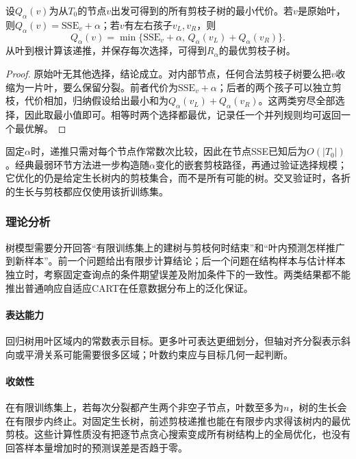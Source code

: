 \begin{theorem}[固定生长树内的最优剪枝]
  \label{thm:regression-pruning}
  设$Q_\alpha(v)$为从$T_0$的节点$v$出发可得到的所有剪枝子树的最小代价。若$v$是原始叶，则$Q_\alpha(v)=\mathrm{SSE}_v+\alpha$；若$v$有左右孩子$v_L,v_R$，则
  \[
    Q_\alpha(v)=\min\{\mathrm{SSE}_v+\alpha,\,
                     Q_\alpha(v_L)+Q_\alpha(v_R)\}.
  \]
  从叶到根计算该递推，并保存每次选择，可得到$R_\alpha$的最优剪枝子树。
\end{theorem}

\begin{proof}
原始叶无其他选择，结论成立。对内部节点，任何合法剪枝子树要么把$v$收缩为一片叶，要么保留分裂。前者代价为$\mathrm{SSE}_v+\alpha$；后者的两个孩子可以独立剪枝，代价相加，归纳假设给出最小和为$Q_\alpha(v_L)+Q_\alpha(v_R)$。这两类穷尽全部选择，因此取最小值即可。相等时两个选择都最优，记录任一个并列规则均可返回一个最优解。
\end{proof}

固定$\alpha$时，递推只需对每个节点作常数次比较，因此在节点SSE已知后为$O(|T_0|)$。经典最弱环节方法进一步构造随$\alpha$变化的嵌套剪枝路径，再通过验证选择规模；它优化的仍是给定生长树内的剪枝集合，而不是所有可能的树。交叉验证时，各折的生长与剪枝都应仅使用该折训练集。

\subsubsection{理论分析}
\label{sec:regression-cart-theory}

树模型需要分开回答“有限训练集上的建树与剪枝何时结束”和“叶内预测怎样推广到新样本”。前一个问题给出有限步计算结论；后一个问题在结构样本与估计样本独立时，考察固定查询点的条件期望误差及附加条件下的一致性。两类结果都不能推出普通响应自适应CART在任意数据分布上的泛化保证。

\paragraph{表达能力}
回归树用叶区域内的常数表示目标。更多叶可表达更细划分，但轴对齐分裂表示斜向或平滑关系可能需要很多区域；叶数约束应与目标几何一起判断。

\paragraph{收敛性}
在有限训练集上，若每次分裂都产生两个非空子节点，叶数至多为$n$，树的生长会在有限步内终止。对固定生长树，前述剪枝递推也能在有限步内求得该树内的最优剪枝。这些计算性质没有把逐节点贪心搜索变成所有树结构上的全局优化，也没有回答样本量增加时的预测误差是否趋于零。

